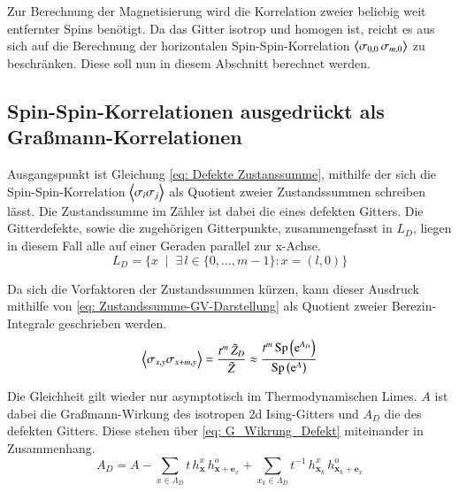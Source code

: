 Zur Berechnung der Magnetisierung wird die Korrelation zweier beliebig weit entfernter Spins benötigt. Da das Gitter isotrop und homogen ist, reicht es aus sich auf die Berechnung der horizontalen Spin-Spin-Korrelation $\left\langle \sigma_{0,0}\,\sigma_{m,0} \right\rangle$ zu beschränken.
Diese soll nun in diesem Abschnitt berechnet werden.

\subsection{Spin-Spin-Korrelationen ausgedrückt als Graßmann-Korrelationen}

Ausgangspunkt ist Gleichung \eqref{eq: Defekte Zustanssumme}, mithilfe der sich die Spin-Spin-Korrelation $\left\langle \sigma_i \sigma_j \right\rangle$ als Quotient zweier Zustandssummen schreiben lässt. Die Zustandssumme im Zähler ist dabei die eines defekten Gitters. Die Gitterdefekte, sowie die zugehörigen Gitterpunkte, zusammengefasst in $L_D$, liegen in diesem Fall alle auf einer Geraden parallel zur x-Achse.
\begin{equation}
L_D = \{ x \;\;|\;\;  \exists\, l \in \{0, \dots, m-1\} : x = (l, 0)\}
\end{equation}

\noindent Da sich die Vorfaktoren der Zustandssummen kürzen, kann dieser Ausdruck mithilfe von \eqref{eq: Zustandssumme-GV-Darstellung} als Quotient zweier Berezin-Integrale geschrieben werden. 
\begin{equation} \label{eq: corr_as_Berezion_int}
\left\langle \sigma_{x,y} \sigma_{x+m,y} \right\rangle  = \frac{t^m \, \tilde{Z}_D}{\tilde{Z}} \approx \frac{t^m \, \mathrm{Sp}\left( \mathrm{e}^{A_D} \right)}{\mathrm{Sp}\left( \mathrm{e}^A \right)}
\end{equation}

\noindent Die Gleichheit gilt wieder nur asymptotisch im Thermodynamischen Limes. $A$ ist dabei die Graßmann-Wirkung des isotropen 2d Ising-Gitters und $A_D$ die des defekten Gitters. Diese stehen über \eqref{eq: G_Wikrung_Defekt} miteinander in Zusammenhang.
\begin{equation} \label{eq: G_Wikrung_Defekt}
A_D = A - \sum_{x \in \Lambda_D} t\, h_{\bm{x}}^x\, h_{\bm{x} + \bm{e}_x}^o + \sum_{x_k \in \Lambda_D} t^{-1}\, h_{\bm{x}_k}^x\, h_{\bm{x}_k + \bm{e}_x}^o
\end{equation}

